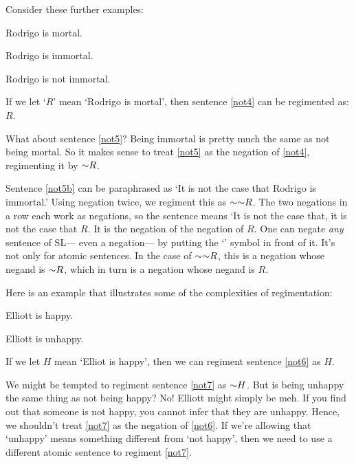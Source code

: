 
Consider these further examples:

\begin{earg}
\item[\ex{not4}] Rodrigo is mortal.
\item[\ex{not5}] Rodrigo is immortal.
\item[\ex{not5b}] Rodrigo is not immortal.
\end{earg}

If we let `$R$' mean `Rodrigo is mortal', then sentence \ref{not4} can be regimented as: $R$.

What about sentence \ref{not5}? Being immortal is pretty much the same as not being mortal.
So it makes sense to treat \ref{not5} as the negation of \ref{not4}, regimenting it by $\enot{R}$.

Sentence \ref{not5b} can be paraphrased as `It is not the case that Rodrigo is immortal.'
Using negation twice, we regiment this as $\enot \enot R$.
The two negations in a row each work as negations, so the sentence means `It is not the case that, it is not the case that $R$.
It is the negation of the negation of $R$.
One can negate \emph{any} sentence of SL--- even a negation--- by putting the `\enot' symbol in front of it.
It's not only for atomic sentences.
In the case of $\enot\enot R$, this is a negation whose negand is $\enot R$, which in turn is a negation whose negand is $R$.

Here is an example that illustrates some of the complexities of regimentation:

\begin{earg}
\item[\ex{not6}] Elliott is happy.
\item[\ex{not7}] Elliott is unhappy.
\end{earg}

If we let $H$ mean `Elliot is happy', then we can regiment sentence \ref{not6} as $H$.

We might be tempted to regiment sentence \ref{not7} as $\enot{H}$.
But is being unhappy the same thing as not being happy? 
No! 
Elliott might simply be meh.
If you find out that someone is not happy, you cannot infer that they are unhappy.
Hence, we shouldn't treat \ref{not7} as the negation of \ref{not6}.
If we're allowing that `unhappy' means something different from `not happy', then we need to use a different atomic sentence to regiment \ref{not7}.

